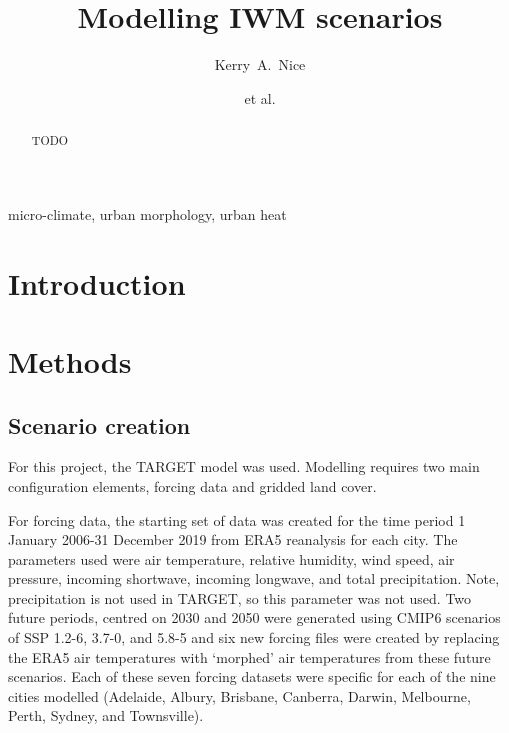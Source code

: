\documentclass[final,3p,times,authoryear]{elsarticle}
\begin{document}
\title{Modelling IWM scenarios }

\author[melb]{Kerry~A.~Nice}
\author[melb]{et al.}
\address[melb]{Transport, Health, and Urban Design Hub, Faculty of Architecture, Building, and Planning, University of Melbourne, Australia.}







\begin{abstract}

TODO

\end{abstract}

\begin{keyword}
micro-climate\sep 
urban morphology\sep
urban heat
\end{keyword}



\maketitle





\section{Introduction}

\section{Methods}\label{sec:methods}

\subsection{Scenario creation}\label{sec:methods_scen}

For this project, the TARGET \citep{Broadbent2019} model was used. Modelling requires two main configuration elements, forcing data and gridded land cover. 

For forcing data, the starting set of data was created for the time period 1 January 2006-31 December 2019 from ERA5 reanalysis for each city. The parameters used were air temperature, relative humidity, wind speed, air pressure, incoming shortwave, incoming longwave, and total precipitation. Note, precipitation is not used in TARGET, so this parameter was not used. Two future periods, centred on 2030 and 2050 were generated using CMIP6 scenarios of SSP 1.2-6, 3.7-0, and 5.8-5 and six new forcing files were created by replacing the ERA5 air temperatures with `morphed' air temperatures from these future scenarios. Each of these seven forcing datasets were specific for each of the nine cities modelled (Adelaide, Albury, Brisbane, Canberra, Darwin, Melbourne, Perth, Sydney, and Townsville).
\end{document}
